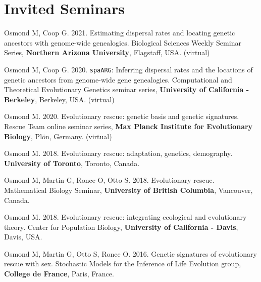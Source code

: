 \documentclass[12pt]{article}
\begin{document}
%

\newpage 
\section*{Invited Seminars}

Osmond M, Coop G. 2021. Estimating dispersal rates and locating genetic ancestors with genome-wide genealogies. Biological Sciences Weekly Seminar Series, \textbf{Northern Arizona University}, Flagstaff, USA. (virtual)

Osmond M, Coop G. 2020. \texttt{spaARG}: Inferring dispersal rates and the locations of genetic ancestors from genome-wide gene genealogies. Computational and Theoretical Evolutionary Genetics seminar series, \textbf{University of California - Berkeley}, Berkeley, USA. (virtual)

Osmond M. 2020. Evolutionary rescue: genetic basis and genetic signatures. Rescue Team online seminar series, \textbf{Max Planck Institute for Evolutionary Biology}, Pl\"{o}n, Germany. (virtual)

Osmond M. 2018. Evolutionary rescue: adaptation, genetics, demography. \textbf{University of Toronto}, Toronto, Canada.

Osmond M, Martin G, Ronce O, Otto S. 2018. Evolutionary rescue. Mathematical Biology Seminar, \textbf{University of British Columbia}, Vancouver, Canada.

Osmond M. 2018. Evolutionary rescue: integrating ecological and evolutionary theory. Center for Population Biology, \textbf{University of California - Davis}, Davis, USA. 

Osmond M, Martin G, Otto S, Ronce O. 2016. Genetic signatures of evolutionary rescue with sex. Stochastic Models for the Inference of Life Evolution group, \textbf{College de France}, Paris, France. 
\end{document}
